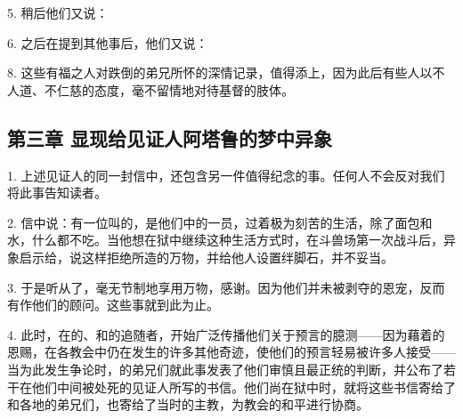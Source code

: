5. 稍后他们又说：\par

6. 之后在提到其他事后，他们又说：\par

\par

\par

8. 这些有福之人对跌倒的弟兄所怀的深情记录，值得添上，因为此后有些人以不人道、不仁慈的态度，毫不留情地对待基督的肢体。\par


\subsection{第三章 显现给见证人阿塔鲁的梦中异象}

1. 上述见证人的同一封信中，还包含另一件值得纪念的事。任何人不会反对我们将此事告知读者。\par

2. 信中说：有一位叫的，是他们中的一员，过着极为刻苦的生活，除了面包和水，什么都不吃。当他想在狱中继续这种生活方式时，在斗兽场第一次战斗后，异象启示给，说这样拒绝所造的万物，并给他人设置绊脚石，并不妥当。\par

3. 于是听从了，毫无节制地享用万物，感谢。因为他们并未被剥夺的恩宠，反而有作他们的顾问。这些事就到此为止。\par

4. 此时，在的、和的追随者，开始广泛传播他们关于预言的臆测——因为藉着的恩赐，在各教会中仍在发生的许多其他奇迹，使他们的预言轻易被许多人接受——当为此发生争论时，的弟兄们就此事发表了他们审慎且最正统的判断，并公布了若干在他们中间被处死的见证人所写的书信。他们尚在狱中时，就将这些书信寄给了和各地的弟兄们，也寄给了当时的主教，为教会的和平进行协商。\par

